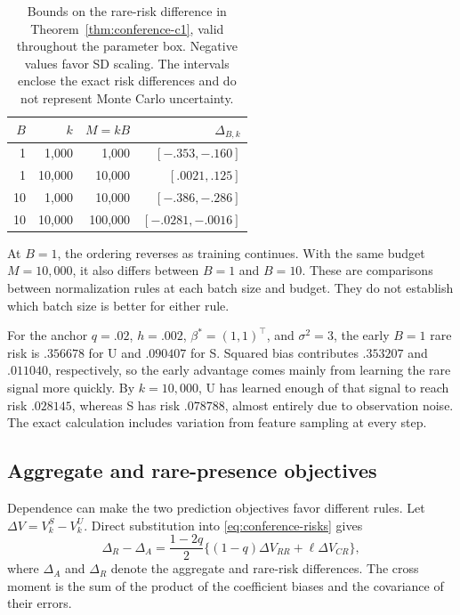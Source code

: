 \begin{table}[t]
 \centering
 \begin{tabular}{rrrr}
  \toprule
  $B$ &    $k$ & $M = kB$ &    $\Delta_{B,k}$ \\
  \midrule
    1 &  1,000 &    1,000 &   $[-.353,-.160]$ \\
    1 & 10,000 &   10,000 &    $[.0021,.125]$ \\
   10 &  1,000 &   10,000 &   $[-.386,-.286]$ \\
   10 & 10,000 &  100,000 & $[-.0281,-.0016]$ \\
  \bottomrule
 \end{tabular}
 \caption{
  Bounds on the rare-risk difference in Theorem~\ref{thm:conference-c1}, valid
  throughout the parameter box. Negative values favor SD scaling. The intervals
  enclose the exact risk differences and do not represent Monte Carlo
  uncertainty.
 }
 \label{tab:conference-c1}
\end{table}

At $B = 1$, the ordering reverses as training continues. With the same budget
$M = 10{,}000$, it also differs between $B = 1$ and $B = 10$. These are
comparisons between normalization rules at each batch size and budget. They do
not establish which batch size is better for either rule.

For the anchor $q = .02$, $h = .002$, $\beta^* = (1,1)^\top$, and
$\sigma^2 = 3$, the early $B = 1$ rare risk is $.356678$ for U and $.090407$ for
S. Squared bias contributes $.353207$ and $.011040$, respectively, so the early
advantage comes mainly from learning the rare signal more quickly. By
$k = 10{,}000$, U has learned enough of that signal to reach risk $.028145$,
whereas S has risk $.078788$, almost entirely due to observation noise. The
exact calculation includes variation from feature sampling at every step.

\subsection{Aggregate and rare-presence objectives}

Dependence can make the two prediction objectives favor different rules. Let
$\Delta V = V_k^S - V_k^U$. Direct substitution into \eqref{eq:conference-risks}
gives
\begin{equation}
 \Delta_R - \Delta_A = \frac{1 - 2q}{2}\bigl\{(1 - q)\Delta V_{RR} + \ell\Delta V_{CR}\bigr\}, \label{eq:conference-objectives}
\end{equation}
where $\Delta_A$ and $\Delta_R$ denote the aggregate and rare-risk differences.
The cross moment is the sum of the product of the coefficient biases and the
covariance of their errors.

